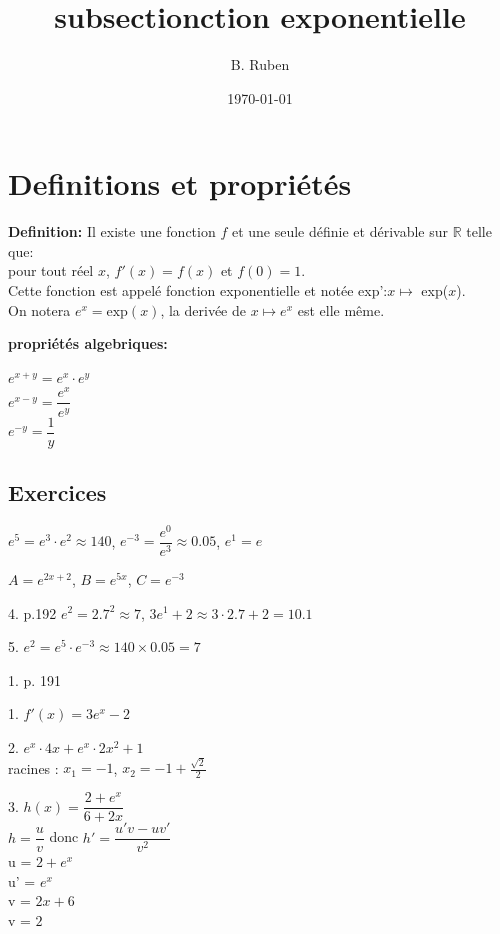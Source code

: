 \documentclass[12pt]{article}
\begin{document}
\title{subsectionction exponentielle}
\author{B. Ruben}
\date{\today}

\maketitle

\section{Definitions et propriétés}

\begin{mdframed}
    \textbf{Definition:} Il existe une fonction $f$ et une seule définie et dérivable sur $\mathbb{R}$ telle que:\\ pour tout réel $x$, $f'(x) = f(x)$ et $f(0) = 1$.
    \\ Cette fonction est appelé fonction exponentielle et notée exp':$x \mapsto$ exp($x$).
    \\ On notera $e^x = \text{exp}(x)$, la derivée de $x \mapsto e^{x}$ est elle même.
\end{mdframed}

\begin{mdframed}
    \textbf{propriétés algebriques:}

    $e^{x+y} = e^x \cdot e^y$ \\ $e^{x-y} = \dfrac{e^x}{e^y}$ \\ $e^{-y} = \dfrac{1}{y}$
\end{mdframed}

\subsection*{Exercices}

$e^5 = e^3 \cdot e^2 \approx 140$, $e^{-3} = \dfrac{e^0}{e^3} \approx 0.05$, $e^1 = e$

$A = e^{2x+2}$, $B = e^{5x}$, $C = e^{-3}$


4. p.192
$e^2 = 2.7^2 \approx 7$, $3e^1 + 2 \approx 3 \cdot 2.7 + 2 = 10.1$

5. $e^2 = e^5 \cdot e^{-3} \approx{ 140 \times 0.05 = 7 }$

1. p. 191

1. $f'(x) = 3e^{x} - 2$

2. $e^x\cdot4x + e^x \cdot 2x^2 + 1$\\
racines : $x_1 = -1$, $x_2 = -1+\frac{\sqrt{2}}{2}$

3. $h(x) = \dfrac{2+e^x}{6+2x}$\\
$h = \dfrac{u}{v}$ donc $h' = \dfrac{u'v-uv'}{v^2}$\\
u = $2 + e^x$\\
u' = $e^x$\\
v = $2x+6$\\
v = $2$
\end{document}
